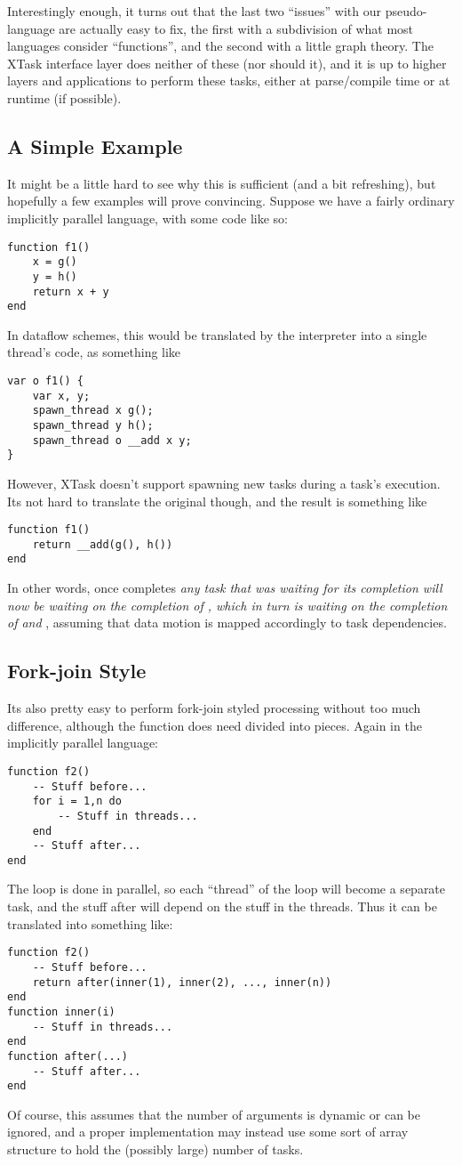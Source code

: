 \documentclass{article}
\begin{document}
Interestingly enough, it turns out that the last two ``issues'' with our pseudo-language are actually easy to fix, the first with a subdivision of what most languages consider ``functions'', and the second with a little graph theory. The XTask interface layer does neither of these (nor should it), and it is up to higher layers and applications to perform these tasks, either at parse/compile time or at runtime (if possible).

\subsection{A Simple Example}
It might be a little hard to see why this is sufficient (and a bit refreshing), but hopefully a few examples will prove convincing. Suppose we have a fairly ordinary implicitly parallel language, with some code like so:
\begin{verbatim}
function f1()
    x = g()
    y = h()
    return x + y
end
\end{verbatim}
In dataflow schemes, this would be translated by the interpreter into a single thread's code, as something like
\begin{verbatim}
var o f1() {
    var x, y;
    spawn_thread x g();
    spawn_thread y h();
    spawn_thread o __add x y;
}
\end{verbatim}
However, XTask doesn't support spawning new tasks during a task's execution. Its not hard to translate the original though, and the result is something like
\begin{verbatim}
function f1()
    return __add(g(), h())
end
\end{verbatim}
In other words, once  completes \textit{any task that was waiting for its completion will now be waiting on the completion of , which in turn is waiting on the completion of  and }, assuming that data motion is mapped accordingly to task dependencies.

\subsection{Fork-join Style}
Its also pretty easy to perform fork-join styled processing without too much difference, although the function does need divided into pieces. Again in the implicitly parallel language:
\begin{verbatim}
function f2()
    -- Stuff before...
    for i = 1,n do
        -- Stuff in threads...
    end
    -- Stuff after...
end
\end{verbatim}
The  loop is done in parallel, so each ``thread'' of the loop will become a separate task, and the stuff after will depend on the stuff in the threads. Thus it can be translated into something like:
\begin{verbatim}
function f2()
    -- Stuff before...
    return after(inner(1), inner(2), ..., inner(n))
end
function inner(i)
    -- Stuff in threads...
end
function after(...)
    -- Stuff after...
end
\end{verbatim}
Of course, this assumes that the number of arguments is dynamic or can be ignored, and a proper implementation may instead use some sort of array structure to hold the (possibly large) number of tasks.
\end{document}
